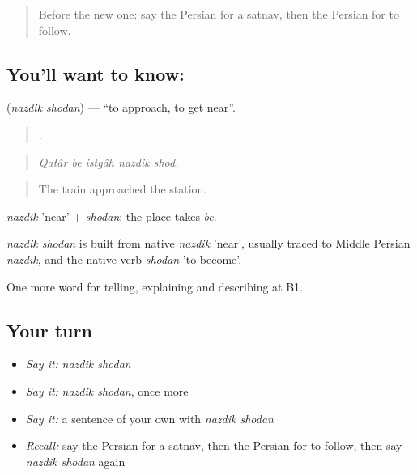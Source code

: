 \label{lesson:FA-C449-nazdik-shodan}



\begin{quote}
Before the new one: say the Persian for a satnav, then the Persian for to follow.
\end{quote}

\subsection*{You'll want to know:  }
\textbf{ } (\emph{nazdik shodan}) — \textquotedblleft{}to approach, to get near\textquotedblright{}.

\begin{quote}
    .
\end{quote}

\begin{quote}
\emph{Qatâr be istgâh nazdik shod.}
\end{quote}

\begin{quote}
The train approached the station.
\end{quote}

\emph{nazdik} 'near' + \emph{shodan}; the place takes \emph{be}.

\begin{cousinweb}
\emph{nazdik shodan} is built from native \emph{nazdik} 'near', usually traced to Middle Persian \emph{nazdīk}, and the native verb \emph{shodan} 'to become'.
\end{cousinweb}

\begin{grammarlens}[title={What you've built}]
One more word for telling, explaining and describing at B1.
\end{grammarlens}

\subsection*{Your turn}
\begin{itemize}
\raggedright
  \item \emph{Say it:} \emph{nazdik shodan}
  \item \emph{Say it:} \emph{nazdik shodan}, once more
  \item \emph{Say it:} a sentence of your own with \emph{nazdik shodan}
  \item \emph{Recall:} say the Persian for a satnav, then the Persian for to follow, then say \emph{nazdik shodan} again
\end{itemize}

